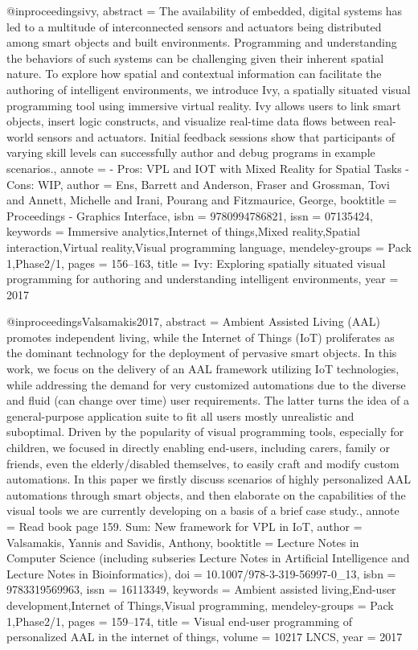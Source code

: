 @inproceedings{ivy,
    abstract = {The availability of embedded, digital systems has led to a multitude of interconnected sensors and actuators being distributed among smart objects and built environments. Programming and understanding the behaviors of such systems can be challenging given their inherent spatial nature. To explore how spatial and contextual information can facilitate the authoring of intelligent environments, we introduce Ivy, a spatially situated visual programming tool using immersive virtual reality. Ivy allows users to link smart objects, insert logic constructs, and visualize real-time data flows between real-world sensors and actuators. Initial feedback sessions show that participants of varying skill levels can successfully author and debug programs in example scenarios.},
    annote = {- Pros: VPL and IOT with Mixed Reality for Spatial Tasks
    - Cons: WIP},
    author = {Ens, Barrett and Anderson, Fraser and Grossman, Tovi and Annett, Michelle and Irani, Pourang and Fitzmaurice, George},
    booktitle = {Proceedings - Graphics Interface},
    isbn = {9780994786821},
    issn = {07135424},
    keywords = {Immersive analytics,Internet of things,Mixed reality,Spatial interaction,Virtual reality,Visual programming language},
    mendeley-groups = {Pack 1,Phase2/1},
    pages = {156--163},
    title = {{Ivy: Exploring spatially situated visual programming for authoring and understanding intelligent environments}},
    year = {2017}
}

@inproceedings{Valsamakis2017,
    abstract = {Ambient Assisted Living (AAL) promotes independent living, while the Internet of Things (IoT) proliferates as the dominant technology for the deployment of pervasive smart objects. In this work, we focus on the delivery of an AAL framework utilizing IoT technologies, while addressing the demand for very customized automations due to the diverse and fluid (can change over time) user requirements. The latter turns the idea of a general-purpose application suite to fit all users mostly unrealistic and suboptimal. Driven by the popularity of visual programming tools, especially for children, we focused in directly enabling end-users, including carers, family or friends, even the elderly/disabled themselves, to easily craft and modify custom automations. In this paper we firstly discuss scenarios of highly personalized AAL automations through smart objects, and then elaborate on the capabilities of the visual tools we are currently developing on a basis of a brief case study.},
    annote = {Read book page 159.
    Sum: New framework for VPL in IoT},
    author = {Valsamakis, Yannis and Savidis, Anthony},
    booktitle = {Lecture Notes in Computer Science (including subseries Lecture Notes in Artificial Intelligence and Lecture Notes in Bioinformatics)},
    doi = {10.1007/978-3-319-56997-0_13},
    isbn = {9783319569963},
    issn = {16113349},
    keywords = {Ambient assisted living,End-user development,Internet of Things,Visual programming},
    mendeley-groups = {Pack 1,Phase2/1},
    pages = {159--174},
    title = {{Visual end-user programming of personalized AAL in the internet of things}},
    volume = {10217 LNCS},
    year = {2017}
}

